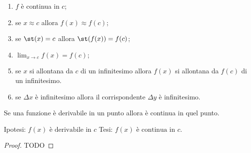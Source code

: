 \begin{enumerate}[noitemsep]
 \item \(f\) è continua in \(c\);
 \item se \(x \approx c\) allora \(f(x) \approx f(c)\);
 \item se \(\st(x) = c\) allora \(\st(f(x)) = f(c)\);
 \item \(\lim_{x \to c} f(x) = f(c)\);
 \item se \(x\) si allontana da \(c\) di un infinitesimo allora 
   \(f(x)\) si allontana da \(f(c)\) di un infinitesimo.
 \item se \(\Delta x\) è infinitesimo allora il corrispondente \(\Delta y\) 
   è infinitesimo.
\end{enumerate}

\begin{teorema}
Se una funzione è derivabile in un punto allora è continua in quel punto.
\end{teorema}

\noindent Ipotesi: 
\(f(x) \text{ è derivabile in } c\)
\tab Tesi: 
\(f(x) \text{ è continua in } c\).

\begin{proof}
TODO
\end{proof}

